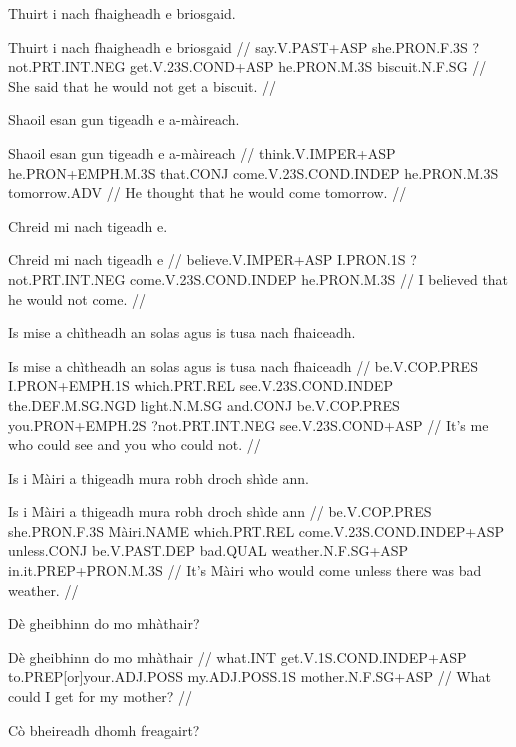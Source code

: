 \documentclass[a4paper,10pt]{article}
\begin{document}
\ex
\begingl
\glpre Thuirt i nach fhaigheadh e briosgaid. 

\vspace{4mm}
\gla Thuirt i nach fhaigheadh e briosgaid  //
\glb say.V.PAST+ASP she.PRON.F.3S ?not.PRT.INT.NEG get.V.23S.COND+ASP he.PRON.M.3S biscuit.N.F.SG  //
\glft She said that he would not get a biscuit. //
\endgl
\xe

\ex
\begingl
\glpre Shaoil esan gun tigeadh e a-màireach. 

\vspace{4mm}
\gla Shaoil esan gun tigeadh e a-màireach  //
\glb think.V.IMPER+ASP he.PRON+EMPH.M.3S that.CONJ come.V.23S.COND.INDEP he.PRON.M.3S tomorrow.ADV  //
\glft He thought that he would come tomorrow. //
\endgl
\xe

\ex
\begingl
\glpre Chreid mi nach tigeadh e. 

\vspace{4mm}
\gla Chreid mi nach tigeadh e  //
\glb believe.V.IMPER+ASP I.PRON.1S ?not.PRT.INT.NEG come.V.23S.COND.INDEP he.PRON.M.3S  //
\glft I believed that he would not come. //
\endgl
\xe

\ex
\begingl
\glpre Is mise a chìtheadh an solas agus is tusa nach fhaiceadh. 

\vspace{4mm}
\gla Is mise a chìtheadh an solas agus is tusa nach fhaiceadh  //
\glb be.V.COP.PRES I.PRON+EMPH.1S which.PRT.REL see.V.23S.COND.INDEP the.DEF.M.SG.NGD light.N.M.SG and.CONJ be.V.COP.PRES you.PRON+EMPH.2S ?not.PRT.INT.NEG see.V.23S.COND+ASP  //
\glft It's me who could see and you who could not. //
\endgl
\xe

\ex
\begingl
\glpre Is i Màiri a thigeadh mura robh droch shìde ann. 

\vspace{4mm}
\gla Is i Màiri a thigeadh mura robh droch shìde ann  //
\glb be.V.COP.PRES she.PRON.F.3S Màiri.NAME which.PRT.REL come.V.23S.COND.INDEP+ASP unless.CONJ be.V.PAST.DEP bad.QUAL weather.N.F.SG+ASP in.it.PREP+PRON.M.3S  //
\glft It's Màiri who would come unless there was bad weather. //
\endgl
\xe

\ex
\begingl
\glpre Dè gheibhinn do mo mhàthair? 

\vspace{4mm}
\gla Dè gheibhinn do mo mhàthair  //
\glb what.INT get.V.1S.COND.INDEP+ASP to.PREP[or]your.ADJ.POSS my.ADJ.POSS.1S mother.N.F.SG+ASP  //
\glft What could I get for my mother? //
\endgl
\xe

\ex
\begingl
\glpre Cò bheireadh dhomh freagairt? 
\end{document}
